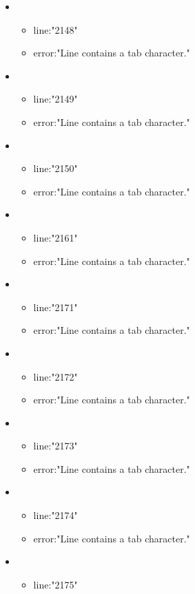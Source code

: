 \begin{itemize}
	\item 
	\begin{itemize} 
		\item line:"2148" 
		\item error:"Line contains a tab character." 
	\end{itemize}
	\item 
	\begin{itemize} 
		\item line:"2149" 
		\item error:"Line contains a tab character." 
	\end{itemize}
	\item 
	\begin{itemize} 
		\item line:"2150" 
		\item error:"Line contains a tab character." 
	\end{itemize}
	\item 
	\begin{itemize} 
		\item line:"2161" 
		\item error:"Line contains a tab character." 
	\end{itemize}
	\item 
	\begin{itemize} 
		\item line:"2171" 
		\item error:"Line contains a tab character." 
	\end{itemize}
	\item 
	\begin{itemize} 
		\item line:"2172" 
		\item error:"Line contains a tab character." 
	\end{itemize}
	\item 
	\begin{itemize} 
		\item line:"2173" 
		\item error:"Line contains a tab character." 
	\end{itemize}
	\item 
	\begin{itemize} 
		\item line:"2174" 
		\item error:"Line contains a tab character." 
	\end{itemize}
	\item 
	\begin{itemize} 
		\item line:"2175" 

\end{itemize}
\end{itemize}

